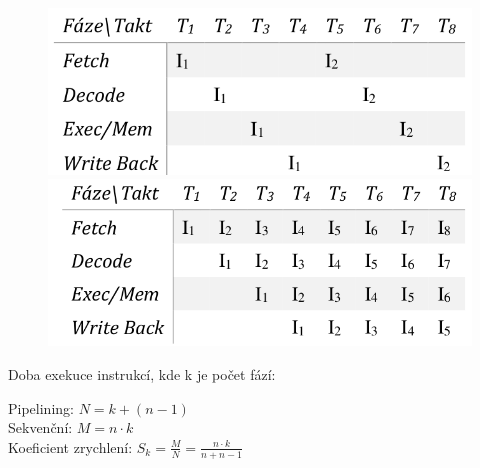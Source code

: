 \begin{figure}[h!]
    \centering
    \begin{minipage}[b]{0.4\textwidth}
        \includegraphics[width=\textwidth]{img/sekv.png}
    \end{minipage}
    \hfill
    \begin{minipage}[b]{0.4\textwidth}
        \includegraphics[width=\textwidth]{img/pipeline.png}
    \end{minipage}
\end{figure}

Doba exekuce instrukcí, kde k je počet fází:
\begin{center}
    Pipelining: $N = k + (n-1)$\\
    Sekvenční: $M = n \cdot k$ \\
    Koeficient zrychlení: $S_k = \frac{M}{N} = \frac{n \cdot k}{n + n-1}$
\end{center}

